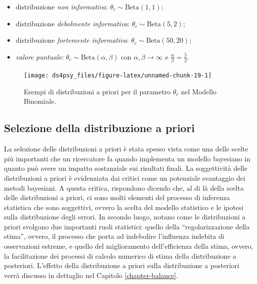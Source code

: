 \documentclass[
  11pt,
]{krantz}
\providecommand{\tightlist}{%
  \setlength{\itemsep}{0pt}\setlength{\parskip}{0pt}}
\theoremstyle{definition}
\theoremstyle{definition}
\theoremstyle{definition}
\theoremstyle{definition}
\theoremstyle{remark}
\begin{document}
\begin{itemize}
\tightlist
\item
  distribuzione \emph{non informativa}: \(\theta_c \sim \mbox{Beta}(1,1)\);
\item
  distribuzione \emph{debolmente informativa}: \(\theta_c \sim \mbox{Beta}(5,2)\);
\item
  distribuzione \emph{fortemente informativa}: \(\theta_c \sim \mbox{Beta}(50,20)\);
\item
  \emph{valore puntuale}: \(\theta_c \sim \mbox{Beta}(\alpha, \beta)\) con \(\alpha, \beta \rightarrow \infty\) e \(\frac{\alpha}{\beta} = \frac{5}{2}\).
\end{itemize}

\begin{figure}

{\centering \texttt{[image: ds4psy\_files/figure-latex/unnamed-chunk-19-1]} 

}

\caption{Esempi di distribuzioni a priori per il parametro $\theta_c$ nel Modello Binomiale.}\label{fig:unnamed-chunk-19}
\end{figure}

\hypertarget{selezione-della-distribuzione-a-priori}{%
\subsection{Selezione della distribuzione a priori}\label{selezione-della-distribuzione-a-priori}}

La selezione delle distribuzioni a priori è stata spesso vista come una delle scelte più importanti che un ricercatore fa quando implementa un modello bayesiano in quanto può avere un impatto sostanziale sui risultati finali. La soggettività delle distribuzioni a priori è evidenziata dai critici come un potenziale svantaggio dei metodi bayesiani. A questa critica, \citet{vandeSchoot2021modelling} rispondono dicendo che, al di là della scelta delle distribuzioni a priori, ci sono molti elementi del processo di inferenza statistica che sono soggettivi, ovvero la scelta del modello statistico e le ipotesi sulla distribuzione degli errori. In secondo luogo, \citet{vandeSchoot2021modelling} notano come le distribuzioni a priori svolgono due importanti ruoli statistici: quello della ``regolarizzazione della stima'', ovvero, il processo che porta ad indebolire l'influenza indebita di osservazioni estreme, e quello del miglioramento dell'efficienza della stima, ovvero, la facilitazione dei processi di calcolo numerico di stima della distribuzione a posteriori. L'effetto della distribuzione a priori sulla distribuzione a posteriori verrà discusso in dettaglio nel Capitolo \ref{chapter-balance}.
\end{document}
